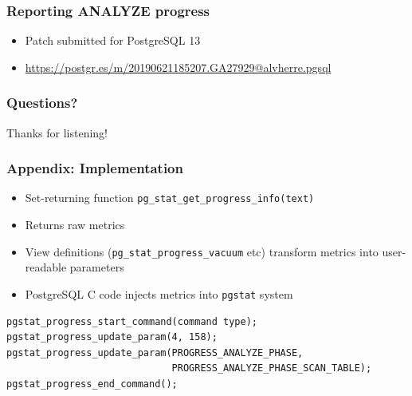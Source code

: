\documentclass[ignorenonframetext,t]{beamer}
\begin{document}
\begin{frame}
  \frametitle{Reporting ANALYZE progress}

  \begin{itemize}
    \item Patch submitted for PostgreSQL 13
    \item \url{https://postgr.es/m/20190621185207.GA27929@alvherre.pgsql}
  \end{itemize}
\end{frame}

\begin{frame}
  \frametitle{Questions?}

  \centering
  Thanks for listening!

\end{frame}

\begin{frame}[fragile]
  \frametitle{Appendix: Implementation}

  \begin{itemize}
    \item Set-returning function \texttt{pg\_stat\_get\_progress\_info(text)}
    \item Returns raw metrics
    \item View definitions (\texttt{pg\_stat\_progress\_vacuum} etc) transform metrics
      into user-readable parameters
    \item PostgreSQL C code injects metrics into \texttt{pgstat} system
  \end{itemize}
\vfill
\begin{verbatim}
pgstat_progress_start_command(command type);
pgstat_progress_update_param(4, 158);
pgstat_progress_update_param(PROGRESS_ANALYZE_PHASE,
                             PROGRESS_ANALYZE_PHASE_SCAN_TABLE);
pgstat_progress_end_command();
  \end{verbatim}

\end{frame}
\end{document}
